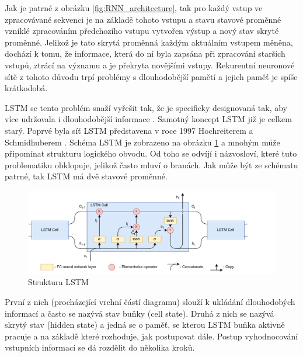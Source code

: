 Jak je patrné z obrázku \ref{fig:RNN_architecture}, tak pro každý vstup ve zpracovávané sekvenci je na základě tohoto vstupu a stavu stavové proměnné vzniklé zpracováním předchozího vstupu vytvořen výstup a nový stav skryté proměnné.
Jelikož je tato skrytá proměnná každým aktuálním vstupem měněna, dochází k tomu, že informace, která do ní byla zapsána při zpracování starších vstupů, ztrácí na významu a je překryta novějšími vstupy.
Rekurentní neuronové sítě z tohoto důvodu trpí problémy s dlouhodobější pamětí a jejich paměť je spíše krátkodobá.

LSTM se tento problém snaží vyřešit tak, že je specificky designovaná tak, aby více udržovala i dlouhodobější informace \cite{understaning_lstm}.
Samotný koncept LSTM již je celkem starý.
Poprvé byla síť LSTM představena v roce 1997 Hochreiterem a Schmidhuberem \cite{LSTM}.
Schéma LSTM je zobrazeno na obrázku \ref{fig:LSTM_architecture} a mnohým může připomínat strukturu logického obvodu.
Od toho se odvíjí i názvosloví, které tuto problematiku obklopuje, jelikož často mluví o branách.
Jak může být ze schématu patrné, tak LSTM má dvě stavové proměnné.

\begin{figure}[h!]
	\centering
	\includegraphics[width=\textwidth]{Figures/solution/LSTM_diagram.pdf}
	\caption{Struktura LSTM}
	\label{fig:LSTM_architecture}
\end{figure}



První z nich (procházející vrchní částí diagramu) slouží k ukládání dlouhodobých informací a často se nazývá stav buňky (cell state). Druhá z nich se nazývá skrytý stav (hidden state) a jedná se o paměť, se kterou LSTM buňka aktivně pracuje a na základě které rozhoduje, jak postupovat dále.
Postup vyhodnocování vstupních informací se dá rozdělit do několika kroků.

